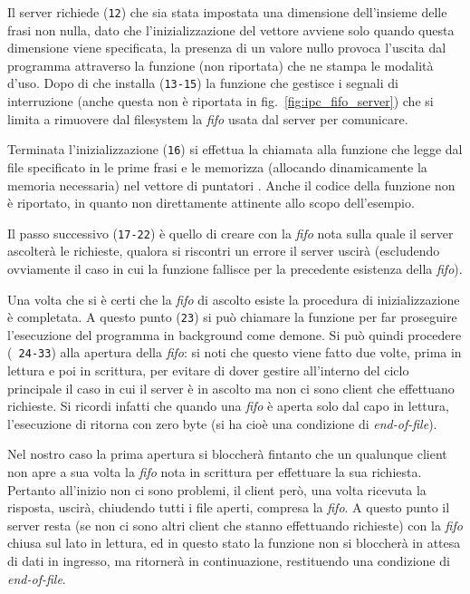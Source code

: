 Il server richiede (\texttt{\small 12}) che sia stata impostata una dimensione
dell'insieme delle frasi non nulla, dato che l'inizializzazione del vettore
 avviene solo quando questa dimensione viene specificata, la
presenza di un valore nullo provoca l'uscita dal programma attraverso la
funzione (non riportata) che ne stampa le modalità d'uso.  Dopo di che
installa (\texttt{\small 13-15}) la funzione che gestisce i segnali di
interruzione (anche questa non è riportata in fig.~\ref{fig:ipc_fifo_server})
che si limita a rimuovere dal filesystem la \textit{fifo} usata dal server per
comunicare.

Terminata l'inizializzazione (\texttt{\small 16}) si effettua la chiamata alla
funzione  che legge dal file specificato in
 le prime  frasi e le memorizza (allocando
dinamicamente la memoria necessaria) nel vettore di puntatori .
Anche il codice della funzione non è riportato, in quanto non direttamente
attinente allo scopo dell'esempio.

Il passo successivo (\texttt{\small 17-22}) è quello di creare con
 la \textit{fifo} nota sulla quale il server ascolterà le
richieste, qualora si riscontri un errore il server uscirà (escludendo
ovviamente il caso in cui la funzione  fallisce per la precedente
esistenza della \textit{fifo}).

Una volta che si è certi che la \textit{fifo} di ascolto esiste la procedura
di inizializzazione è completata. A questo punto (\texttt{\small 23}) si può
chiamare la funzione  per far proseguire l'esecuzione del
programma in background come demone.  Si può quindi procedere (\texttt{\small
  24-33}) alla apertura della \textit{fifo}: si noti che questo viene fatto
due volte, prima in lettura e poi in scrittura, per evitare di dover gestire
all'interno del ciclo principale il caso in cui il server è in ascolto ma non
ci sono client che effettuano richieste.  Si ricordi infatti che quando una
\textit{fifo} è aperta solo dal capo in lettura, l'esecuzione di 
ritorna con zero byte (si ha cioè una condizione di \textit{end-of-file}).

Nel nostro caso la prima apertura si bloccherà fintanto che un qualunque
client non apre a sua volta la \textit{fifo} nota in scrittura per effettuare
la sua richiesta. Pertanto all'inizio non ci sono problemi, il client però,
una volta ricevuta la risposta, uscirà, chiudendo tutti i file aperti,
compresa la \textit{fifo}.  A questo punto il server resta (se non ci sono
altri client che stanno effettuando richieste) con la \textit{fifo} chiusa sul
lato in lettura, ed in questo stato la funzione  non si bloccherà
in attesa di dati in ingresso, ma ritornerà in continuazione, restituendo una
condizione di \textit{end-of-file}.

